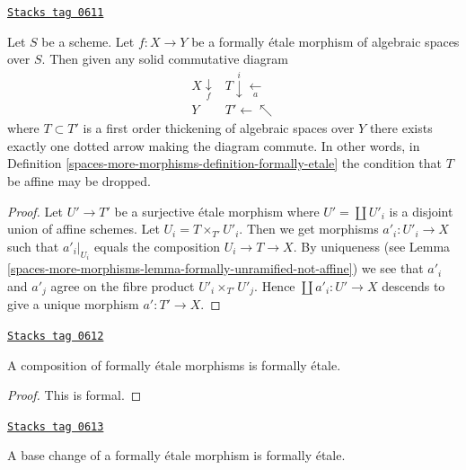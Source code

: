 \begin{lemma}
\label{spaces-more-morphisms-lemma-formally-etale-not-affine}
\href{https://stacks.math.columbia.edu/tag/0611}{\texttt{Stacks tag 0611}}

Let $S$ be a scheme.
Let $f : X \to Y$ be a formally \'etale morphism of algebraic spaces over $S$.
Then given any solid commutative diagram
$$
\begin{array}{cc}X \underset{f}{\downarrow} & T \overset{i}{\downarrow}\underset{a}{\longleftarrow} \\ Y & T' \longleftarrow\nwarrow\end{array}
$$
where $T \subset T'$ is a first order thickening of algebraic spaces
over $Y$ there exists exactly one dotted arrow making the diagram commute.
In other words, in
Definition \ref{spaces-more-morphisms-definition-formally-etale}
the condition that $T$ be affine may be dropped.
\end{lemma}

\begin{proof}
Let $U' \to T'$ be a surjective \'etale morphism where $U' = \coprod U'_i$
is a disjoint union of affine schemes. Let
$U_i = T \times_{T'} U'_i$. Then we get morphisms
$a'_i : U'_i \to X$ such that $a'_i|_{U_i}$ equals the composition
$U_i \to T \to X$. By uniqueness (see
Lemma \ref{spaces-more-morphisms-lemma-formally-unramified-not-affine})
we see that $a'_i$ and $a'_j$ agree on the fibre product
$U'_i \times_{T'} U'_j$. Hence $\coprod a'_i : U' \to X$
descends to give a unique morphism $a' : T' \to X$.
\end{proof}

\begin{lemma}
\label{spaces-more-morphisms-lemma-composition-formally-etale}
\href{https://stacks.math.columbia.edu/tag/0612}{\texttt{Stacks tag 0612}}

A composition of formally \'etale morphisms is formally \'etale.
\end{lemma}

\begin{proof}
This is formal.
\end{proof}

\begin{lemma}
\label{spaces-more-morphisms-lemma-base-change-formally-etale}
\href{https://stacks.math.columbia.edu/tag/0613}{\texttt{Stacks tag 0613}}

A base change of a formally \'etale morphism is formally \'etale.
\end{lemma}

